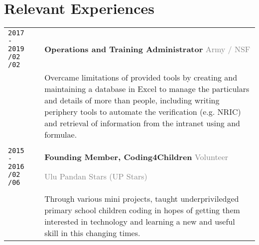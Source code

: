 \section{\textcolor{section_3}{Relevant Experiences}}
\vspace{-\baselineskip}
{
	\renewcommand{\arraystretch}{2}
	\renewcommand{\cellalign}{lt}
	\begin{tabularx}{\textwidth}{@{}l p{0.20cm} X @{}}
		\makecell{\texttt{\large 2017 - 2019} \vspace{-1mm} \\ \texttt{\footnotesize /02} \hspace{1.5em} \texttt{\footnotesize /02}} & & \textbf{Operations and Training Administrator} \hfill \textcolor{gray}{Army / NSF} \\[-1em]
		& & {\small Overcame limitations of provided tools by creating and maintaining a database in Excel to manage the particulars and details of more than \nummer{1200} people, including writing periphery tools to automate the verification {\footnotesize(e.g. NRIC)} and retrieval of information from the intranet using \code{VBA} and formulae. }\\
		\makecell{\texttt{\large 2015 - 2016} \vspace{-1mm} \\ \texttt{\footnotesize /02} \hspace{1.5em} \texttt{\footnotesize /06}} & & \textbf{Founding Member, Coding4Children} \hfill \textcolor{gray}{Volunteer} \par \textcolor{gray}{Ulu Pandan Stars {\footnotesize (UP Stars)}}\\[-0.5em]
		& & {\small Through various mini \code{scratch} projects, taught underpriviledged primary school children coding in hopes of getting them interested in technology and learning a new and useful skill in this changing times. } \\

\end{tabularx}}
